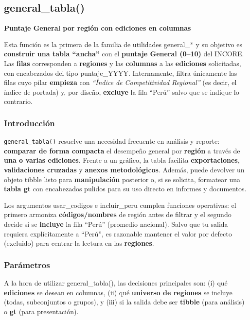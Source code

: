 \documentclass[
  11pt,
  letterpaper,
  DIV=11,
  numbers=noendperiod]{scrartcl}
\begin{document}
\subsection{\texorpdfstring{\textbf{general\_tabla()}}{general\_tabla()}}\label{general_tabla}

\textbf{Puntaje General por región con ediciones en columnas}

Esta función es la primera de la familia de utilidades general\_* y su
objetivo es \textbf{construir una tabla ``ancha''} con el
\textbf{puntaje General (0--10)} del INCORE. Las \textbf{filas}
corresponden a \textbf{regiones} y las \textbf{columnas} a las
\textbf{ediciones} solicitadas, con encabezados del tipo puntaje\_YYYY.
Internamente, filtra únicamente las filas cuyo pilar \textbf{empieza}
con \emph{``Índice de Competitividad Regional''} (es decir, el índice de
portada) y, por diseño, \textbf{excluye} la fila ``Perú'' salvo que se
indique lo contrario.

\subsubsection{\texorpdfstring{\textbf{Introducción}}{Introducción}}\label{introducciuxf3n-1}

\texttt{general\_tabla()} resuelve una necesidad frecuente en análisis y
reporte: \textbf{comparar de forma compacta} el desempeño general por
\textbf{región} a través de \textbf{una o varias ediciones}. Frente a un
gráfico, la tabla facilita \textbf{exportaciones}, \textbf{validaciones
cruzadas} y \textbf{anexos metodológicos}. Además, puede devolver un
objeto tibble listo para \textbf{manipulación} posterior o, si se
solicita, formatear una \textbf{tabla gt} con encabezados pulidos para
su uso directo en informes y documentos.

Los argumentos usar\_codigos e incluir\_peru cumplen funciones
operativas: el primero armoniza \textbf{códigos/nombres} de región antes
de filtrar y el segundo decide si se \textbf{incluye} la fila ``Perú''
(promedio nacional). Salvo que tu salida requiera explícitamente a
``Perú'', es razonable mantener el valor por defecto (excluido) para
centrar la lectura en las \textbf{regiones}.

\subsubsection{\texorpdfstring{\textbf{Parámetros}}{Parámetros}}\label{paruxe1metros}

A la hora de utilizar general\_tabla(), las decisiones principales son:
(i) qué \textbf{ediciones} se desean en columnas, (ii) qué
\textbf{universo de regiones} se incluye (todas, subconjuntos o grupos),
y (iii) si la salida debe ser \textbf{tibble} (para análisis) o
\textbf{gt} (para presentación).
\end{document}
